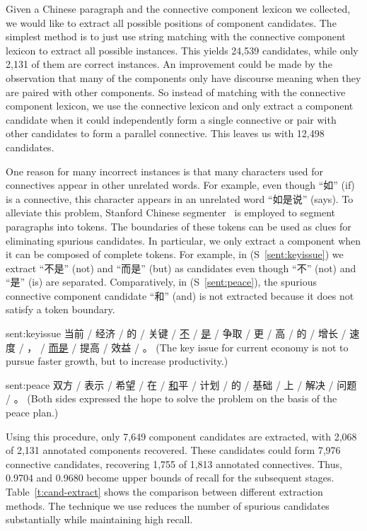 Given a Chinese paragraph and the connective component lexicon we collected,
we would like to extract all possible positions of component candidates.
The simplest method is to just use string matching with the connective
component lexicon to extract all possible instances. This yields
24,539 candidates, while only 2,131 of them are correct instances. An improvement
could be made by the observation that many of the components only have
discourse meaning when they are paired with other components. So instead of matching
with the connective component lexicon, we use the connective lexicon and only extract
a component candidate when it could independently form a single connective or pair
with other candidates to form a parallel connective.
This leaves us with 12,498 candidates.

One reason for many incorrect instances is that many characters used for connectives
appear in other unrelated words. For example, even though ``如'' (if) is a connective,
this character appears in an unrelated word ``如是说'' (says). To alleviate this problem,
Stanford Chinese segmenter~\citep{chang2008optimizing} is employed to segment paragraphs
into tokens. The boundaries of these tokens can be used as clues for eliminating spurious candidates.
In particular, we only extract a component when it can be composed of complete tokens.
For example, in (S~\ref{sent:keyissue}) we extract ``不是'' (not) and ``而是'' (but) as candidates
even though ``不'' (not) and ``是'' (is) are separated. Comparatively, in (S~\ref{sent:peace}),
the spurious connective component candidate ``和'' (and) is not extracted because it does
not satisfy a token boundary.

\begin{sent}{sent:keyissue}{}
    当前 / 经济 / 的 / 关键 / \underline{不} / \underline{是} / 争取 / 更 /
    高 / 的 / 增长 / 速度 / ， / \underline{而是} / 提高 / 效益 / 。
    (The key issue for current economy is not to pursue faster growth, but to
    increase productivity.)
\end{sent}

\begin{sent}{sent:peace}{}
    双方 / 表示 / 希望 / 在 / \underline{和}平 / 计划 / 的 / 基础 / 上 / 解决 / 问题 / 。
    (Both sides expressed the hope to solve the problem on the basis of the peace plan.)
\end{sent}

Using this procedure, only 7,649 component candidates are extracted, with 2,068 of 2,131 annotated
components recovered. These candidates could form 7,976 connective candidates, recovering
1,755 of 1,813 annotated connectives. Thus, 0.9704 and 0.9680 become upper bounds of recall
for the subsequent stages. Table~\ref{t:cand-extract} shows the comparison between different
extraction methods. The technique we use reduces the number of spurious candidates substantially while
maintaining high recall.

